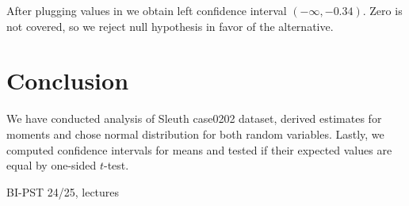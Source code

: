 \documentclass[12pt,a4paper]{article} %
\begin{document}
After plugging values in we obtain left confidence interval $(-\infty, -0.34)$. Zero is not covered, so we reject null hypothesis in favor of the alternative.


\section{Conclusion}
We have conducted analysis of Sleuth case0202 dataset, derived estimates for moments and chose normal distribution for both random variables. Lastly, we computed confidence intervals for means and tested if their expected values are equal by one-sided $t$-test.


\begin{thebibliography}{99}
 BI-PST 24/25, lectures
\end{thebibliography}
\end{document}

